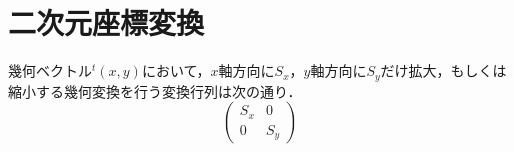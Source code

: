 \section{二次元座標変換}

\begin{theorem}
  幾何ベクトル${}^t(x, y)$において，$x$軸方向に$S_x$，$y$軸方向に$S_y$だけ拡大，もしくは縮小する幾何変換を行う変換行列は次の通り．
  \[
    \begin{pmatrix} S_x & 0 \\ 0 & S_y \end{pmatrix}
  \]
\end{theorem}
